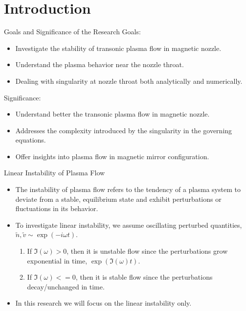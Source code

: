 \section{Introduction}
\begin{frame} {Goals and Significance of the Research}
  Goals:
  \begin{itemize}
    \item Investigate the stability of transonic plasma flow in magnetic nozzle.
    \item Understand the plasma behavior near the nozzle throat.
    \item Dealing with singularity at nozzle throat both analytically and numerically.
  \end{itemize}

  Significance:
  \begin{itemize}
    \item Understand better the transonic plasma flow in magnetic nozzle.
    \item Addresses the complexity introduced by the singularity in the governing equations.
    \item Offer insights into plasma flow in magnetic mirror configuration.
  \end{itemize}
\end{frame}

\begin{frame}{Linear Instability of Plasma Flow}
  \begin{itemize}
    \item The instability of plasma flow refers to the tendency of a plasma system to deviate from a stable, equilibrium state and exhibit perturbations or fluctuations in its behavior. \cite{chen_introduction_2016}
    \item To investigate linear instability, we assume oscillating perturbed quantities, $\tilde{n}, \tilde{v} \sim \exp(-i\omega t)$.
          \begin{enumerate}
            \item If $\Im(\omega) > 0$, then it is unstable flow since the perturbations grow exponential in time, $\exp(\Im(\omega) t)$.
            \item If $\Im(\omega) <=0$, then it is stable flow since the perturbations decay/unchanged in time.
          \end{enumerate}
    \item In this research we will focus on the linear instability only.
  \end{itemize}
\end{frame}

